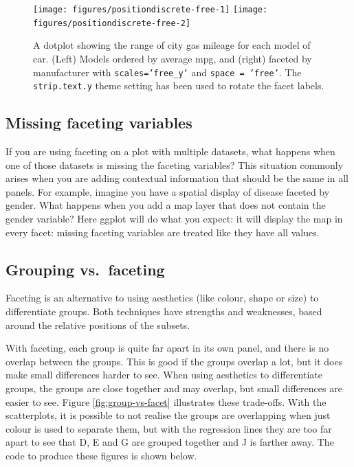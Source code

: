 \begin{figure}

{\centering \texttt{[image: figures/positiondiscrete-free-1]} \texttt{[image: figures/positiondiscrete-free-2]} 

}

\caption{A dotplot showing the range of city gas mileage for each model of car. (Left) Models ordered by average mpg, and (right) faceted by manufacturer with \texttt{scales='free\_y'} and \texttt{space = 'free'}. The \texttt{strip.text.y} theme setting has been used to rotate the facet labels.\label{fig:discrete-free}}
\end{figure}

\subsection{Missing faceting
variables}\label{sub:missing-faceting-columns}

If you are using faceting on a plot with multiple datasets, what happens
when one of those datasets is missing the faceting variables? This
situation commonly arises when you are adding contextual information
that should be the same in all panels. For example, imagine you have a
spatial display of disease faceted by gender. What happens when you add
a map layer that does not contain the gender variable? Here ggplot will
do what you expect: it will display the map in every facet: missing
faceting variables are treated like they have all values.

\subsection{Grouping vs.~faceting}\label{sub:group-vs-facet}

Faceting is an alternative to using aesthetics (like colour, shape or
size) to differentiate groups. Both techniques have strengths and
weaknesses, based around the relative positions of the subsets.
 

With faceting, each group is quite far apart in its own panel, and there
is no overlap between the groups. This is good if the groups overlap a
lot, but it does make small differences harder to see. When using
aesthetics to differentiate groups, the groups are close together and
may overlap, but small differences are easier to see. Figure
\ref{fig:group-vs-facet} illustrates these trade-offs. With the
scatterplots, it is possible to not realise the groups are overlapping
when just colour is used to separate them, but with the regression lines
they are too far apart to see that D, E and G are grouped together and J
is farther away. The code to produce these figures is shown below.

